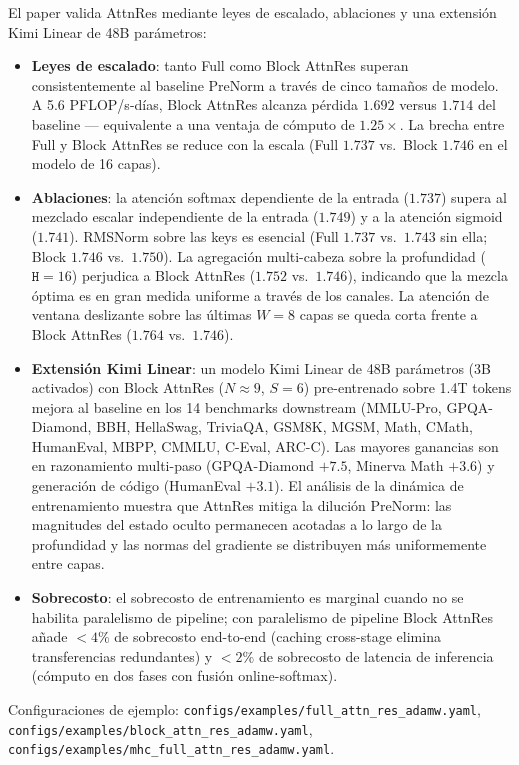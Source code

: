 El paper \citep{sun_attnres_2026} valida AttnRes mediante leyes de
escalado, ablaciones y una extensión Kimi Linear de 48B parámetros:
\begin{itemize}[leftmargin=*]
    \item \textbf{Leyes de escalado}: tanto Full como Block AttnRes
        superan consistentemente al baseline PreNorm a través de cinco
        tamaños de modelo. A 5.6 PFLOP/s-días, Block AttnRes alcanza
        pérdida $1.692$ versus $1.714$ del baseline --- equivalente a
        una ventaja de cómputo de $1.25 \times$. La brecha entre Full y
        Block AttnRes se reduce con la escala (Full $1.737$ vs.\ Block
        $1.746$ en el modelo de 16 capas).
    \item \textbf{Ablaciones}: la atención softmax dependiente de la
        entrada ($1.737$) supera al mezclado escalar independiente de
        la entrada ($1.749$) y a la atención sigmoid ($1.741$). RMSNorm
        sobre las keys es esencial (Full $1.737$ vs.\ $1.743$ sin
        ella; Block $1.746$ vs.\ $1.750$). La agregación multi-cabeza
        sobre la profundidad ($\texttt{H} = 16$) perjudica a Block
        AttnRes ($1.752$ vs.\ $1.746$), indicando que la mezcla
        óptima es en gran medida uniforme a través de los canales. La
        atención de ventana deslizante sobre las últimas $W = 8$ capas
        se queda corta frente a Block AttnRes ($1.764$ vs.\ $1.746$).
    \item \textbf{Extensión Kimi Linear}: un modelo Kimi Linear de
        48B parámetros (3B activados) con Block AttnRes ($N \approx 9$,
        $S = 6$) pre-entrenado sobre 1.4T tokens mejora al baseline en
        los 14 benchmarks downstream (MMLU-Pro, GPQA-Diamond, BBH,
        HellaSwag, TriviaQA, GSM8K, MGSM, Math, CMath, HumanEval,
        MBPP, CMMLU, C-Eval, ARC-C). Las mayores ganancias son en
        razonamiento multi-paso (GPQA-Diamond $+7.5$, Minerva Math
        $+3.6$) y generación de código (HumanEval $+3.1$). El análisis
        de la dinámica de entrenamiento muestra que AttnRes mitiga la
        dilución PreNorm: las magnitudes del estado oculto permanecen
        acotadas a lo largo de la profundidad y las normas del
        gradiente se distribuyen más uniformemente entre capas.
    \item \textbf{Sobrecosto}: el sobrecosto de entrenamiento es
        marginal cuando no se habilita paralelismo de pipeline; con
        paralelismo de pipeline Block AttnRes añade $<4\%$ de
        sobrecosto end-to-end (caching cross-stage elimina
        transferencias redundantes) y $<2\%$ de sobrecosto de latencia
        de inferencia (cómputo en dos fases con fusión online-softmax).
\end{itemize}

Configuraciones de ejemplo: \texttt{configs/examples/full\_attn\_res\_adamw.yaml},
\texttt{configs/examples/block\_attn\_res\_adamw.yaml},
\texttt{configs/examples/mhc\_full\_attn\_res\_adamw.yaml}.
